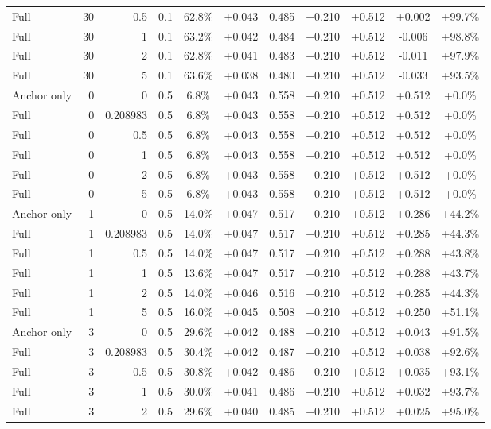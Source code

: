 \begin{table}[htbp]
\begin{tabular}{lrrrccccccc}
Full & 30 & 0.5 & 0.1 & 62.8\% & +0.043 & 0.485 & +0.210 & +0.512 & +0.002 & +99.7\% \\
Full & 30 & 1 & 0.1 & 63.2\% & +0.042 & 0.484 & +0.210 & +0.512 & -0.006 & +98.8\% \\
Full & 30 & 2 & 0.1 & 62.8\% & +0.041 & 0.483 & +0.210 & +0.512 & -0.011 & +97.9\% \\
Full & 30 & 5 & 0.1 & 63.6\% & +0.038 & 0.480 & +0.210 & +0.512 & -0.033 & +93.5\% \\
Anchor only & 0 & 0 & 0.5 & 6.8\% & +0.043 & 0.558 & +0.210 & +0.512 & +0.512 & +0.0\% \\
Full & 0 & 0.208983 & 0.5 & 6.8\% & +0.043 & 0.558 & +0.210 & +0.512 & +0.512 & +0.0\% \\
Full & 0 & 0.5 & 0.5 & 6.8\% & +0.043 & 0.558 & +0.210 & +0.512 & +0.512 & +0.0\% \\
Full & 0 & 1 & 0.5 & 6.8\% & +0.043 & 0.558 & +0.210 & +0.512 & +0.512 & +0.0\% \\
Full & 0 & 2 & 0.5 & 6.8\% & +0.043 & 0.558 & +0.210 & +0.512 & +0.512 & +0.0\% \\
Full & 0 & 5 & 0.5 & 6.8\% & +0.043 & 0.558 & +0.210 & +0.512 & +0.512 & +0.0\% \\
Anchor only & 1 & 0 & 0.5 & 14.0\% & +0.047 & 0.517 & +0.210 & +0.512 & +0.286 & +44.2\% \\
Full & 1 & 0.208983 & 0.5 & 14.0\% & +0.047 & 0.517 & +0.210 & +0.512 & +0.285 & +44.3\% \\
Full & 1 & 0.5 & 0.5 & 14.0\% & +0.047 & 0.517 & +0.210 & +0.512 & +0.288 & +43.8\% \\
Full & 1 & 1 & 0.5 & 13.6\% & +0.047 & 0.517 & +0.210 & +0.512 & +0.288 & +43.7\% \\
Full & 1 & 2 & 0.5 & 14.0\% & +0.046 & 0.516 & +0.210 & +0.512 & +0.285 & +44.3\% \\
Full & 1 & 5 & 0.5 & 16.0\% & +0.045 & 0.508 & +0.210 & +0.512 & +0.250 & +51.1\% \\
Anchor only & 3 & 0 & 0.5 & 29.6\% & +0.042 & 0.488 & +0.210 & +0.512 & +0.043 & +91.5\% \\
Full & 3 & 0.208983 & 0.5 & 30.4\% & +0.042 & 0.487 & +0.210 & +0.512 & +0.038 & +92.6\% \\
Full & 3 & 0.5 & 0.5 & 30.8\% & +0.042 & 0.486 & +0.210 & +0.512 & +0.035 & +93.1\% \\
Full & 3 & 1 & 0.5 & 30.0\% & +0.041 & 0.486 & +0.210 & +0.512 & +0.032 & +93.7\% \\
Full & 3 & 2 & 0.5 & 29.6\% & +0.040 & 0.485 & +0.210 & +0.512 & +0.025 & +95.0\% \\

\end{tabular}
\end{table}
